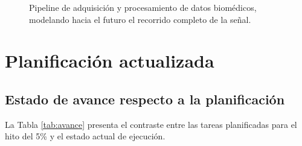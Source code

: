 \documentclass[letterpaper,11pt]{article}
\newcommand{\rtabla}[1]{Tabla \ref{#1}}
\begin{document}
\begin{figure}[H]
{%
    }
    \caption{Pipeline de adquisición y procesamiento de datos biomédicos, modelando hacia el futuro el recorrido completo de la señal.}
    \label{fig:pipeline}
\end{figure}
\shorthandon{>}\shorthandon{<}

\section{Planificación actualizada}

\subsection{Estado de avance respecto a la planificación}

La \rtabla{tab:avance} presenta el contraste entre las tareas planificadas para el hito del 5\% y el estado actual de ejecución.
\end{document}
